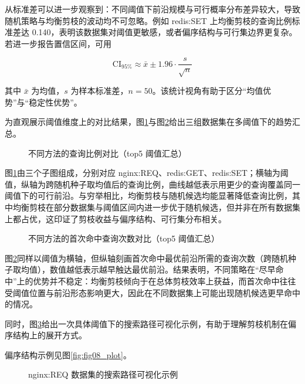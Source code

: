 \documentclass[UTF8,a4paper,12pt,twoside]{ctexart}  %
\begin{document}
从标准差可以进一步观察到：不同阈值下前沿规模与可行概率分布差异较大，导致随机策略与均衡剪枝的波动均不可忽略。例如
redis:SET 上均衡剪枝的查询比例标准差达
0.140，表明该数据集对阈值更敏感，或者偏序结构与可行集边界更复杂。若进一步报告置信区间，可用

\begin{equation}
\text{CI}_{95\%} \approx \bar{x} \pm 1.96\cdot \frac{s}{\sqrt{n}}
\end{equation}

其中 \(\bar{x}\) 为均值，\(s\)
为样本标准差，\(n=50\)。该统计视角有助于区分``均值优势''与``稳定性优势''。

为直观展示阈值维度上的对比结果，图\ref{fig:query-ratio-top5}与图\ref{fig:first-hit-top5}给出三组数据集在多阈值下的趋势汇总。

\begin{figure}[h]
  \centering
  
  \caption{不同方法的查询比例对比（top5 阈值汇总）}
  \label{fig:query-ratio-top5}
\end{figure}

图\ref{fig:query-ratio-top5}由三个子图组成，分别对应 nginx:REQ、redis:GET、redis:SET；横轴为阈值，纵轴为跨随机种子取均值后的查询比例，曲线越低表示用更少的查询覆盖同一阈值下的可行前沿。与穷举相比，均衡剪枝与随机候选均能显著降低查询比例，其中均衡剪枝在部分数据集与阈值区间内进一步优于随机候选，但并非在所有数据集上都占优，这印证了剪枝收益与偏序结构、可行集分布相关。

\begin{figure}[h]
  \centering
  
  \caption{不同方法的首次命中查询次数对比（top5 阈值汇总）}
  \label{fig:first-hit-top5}
\end{figure}

图\ref{fig:first-hit-top5}同样以阈值为横轴，但纵轴刻画首次命中最优前沿所需的查询次数（跨随机种子取均值），数值越低表示越早触达最优前沿。结果表明，不同策略在``尽早命中''上的优势并不稳定：均衡剪枝倾向于在总体剪枝效率上获益，而首次命中往往受阈值位置与前沿形态影响更大，因此在不同数据集上可能出现随机候选更早命中的情况。

同时，图\ref{fig:nginx-search-path}给出一次具体阈值下的搜索路径可视化示例，有助于理解剪枝机制在偏序结构上的展开方式。

偏序结构示例见图\ref{fig:fig08_plot}。

\begin{figure}[h]
  \centering
  
  \caption{nginx:REQ 数据集的搜索路径可视化示例}
  \label{fig:nginx-search-path}
\end{figure}
\end{document}
